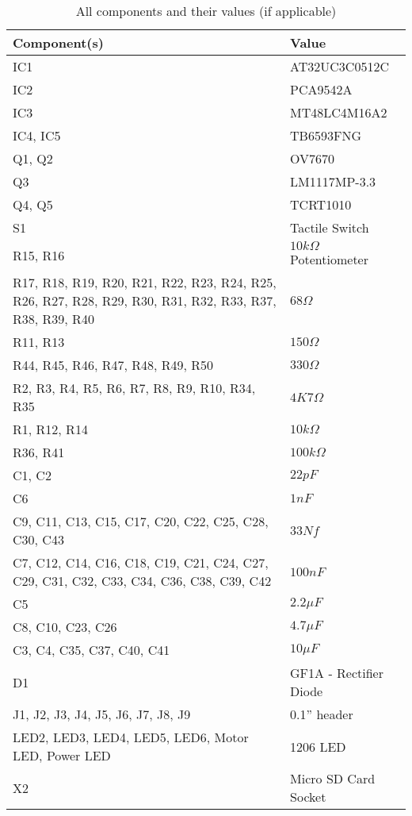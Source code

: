 \begin{table}
\caption{All components and their values (if applicable)}
\label{table:Components}
\begin{tabular}{p{7cm}p{5cm}}\toprule
\textbf{Component(s)}		&	\textbf{Value} \\ \toprule
IC1				&	AT32UC3C0512C \\ \midrule
IC2 & PCA9542A \\ \midrule
IC3 & MT48LC4M16A2 \\ \midrule
IC4, IC5 & TB6593FNG \\ \midrule
Q1, Q2 & OV7670 \\ \midrule
Q3	&	LM1117MP-3.3\\ \midrule
Q4, Q5	& TCRT1010 \\ \midrule
S1				&	Tactile Switch \\ \midrule
R15, R16 & $10k\Omega$ Potentiometer\\ \midrule
R17, R18, R19, R20, R21, R22, R23, R24, R25, R26, R27, R28, R29, R30, R31, R32, R33, R37, R38, R39, R40 & $68\Omega $ \\ \midrule
R11, R13 & $150\Omega$ \\ \midrule
R44, R45, R46, R47, R48, R49, R50	& $330\Omega$ \\ \midrule
R2, R3, R4, R5, R6, R7, R8, R9, R10,  R34, R35 & $4K7\Omega$ \\ \midrule
R1, R12, R14	& $10k\Omega$ \\ \midrule
R36, R41	& $100k\Omega$ \\ \midrule
C1, C2	&	$22pF$ \\ \midrule
C6 & $1nF$ \\ \midrule
C9, C11, C13, C15, C17, C20, C22, C25, C28, C30, C43 & $33Nf$ \\ \midrule
C7, C12, C14, C16, C18, C19, C21, C24, C27, C29, C31, C32, C33, C34, C36, C38, C39, C42	&	$100nF$ \\ \midrule
C5	&	$2.2\mu F$ \\ \midrule
C8, C10, C23, C26  & $4.7\mu F $ \\ \midrule
C3, C4, C35, C37, C40, C41 &	$10\mu F$ \\ \midrule
D1 & GF1A - Rectifier Diode \\ \midrule
J1, J2, J3, J4, J5, J6, J7, J8, J9 & 0.1'' header \\ \midrule
LED2, LED3, LED4, LED5, LED6, Motor LED, Power LED	&	1206 LED \\  \midrule
X2 & Micro SD Card Socket \\ \bottomrule
\end{tabular}
\end{table}